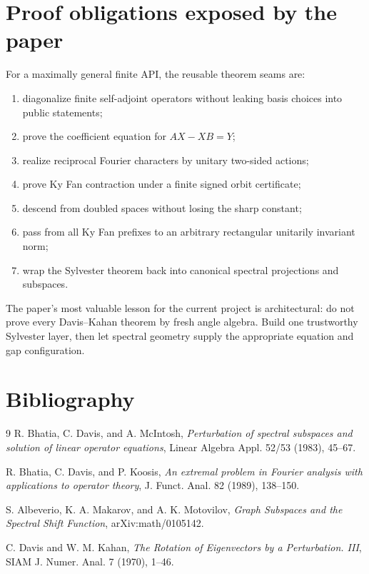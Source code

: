 \section{Proof obligations exposed by the paper}

For a maximally general finite API, the reusable theorem seams are:
\begin{enumerate}[leftmargin=2em]
\item diagonalize finite self-adjoint operators without leaking basis choices into public statements;
\item prove the coefficient equation for $AX-XB=Y$;
\item realize reciprocal Fourier characters by unitary two-sided actions;
\item prove Ky Fan contraction under a finite signed orbit certificate;
\item descend from doubled spaces without losing the sharp constant;
\item pass from all Ky Fan prefixes to an arbitrary rectangular unitarily invariant norm;
\item wrap the Sylvester theorem back into canonical spectral projections and subspaces.
\end{enumerate}

The paper's most valuable lesson for the current project is architectural: do not prove every Davis--Kahan theorem by fresh angle algebra. Build one trustworthy Sylvester layer, then let spectral geometry supply the appropriate equation and gap configuration.

\section*{Bibliography}
\begin{thebibliography}{9}
R. Bhatia, C. Davis, and A. McIntosh,
\emph{Perturbation of spectral subspaces and solution of linear operator equations},
Linear Algebra Appl. 52/53 (1983), 45--67.

R. Bhatia, C. Davis, and P. Koosis,
\emph{An extremal problem in Fourier analysis with applications to operator theory},
J. Funct. Anal. 82 (1989), 138--150.

S. Albeverio, K. A. Makarov, and A. K. Motovilov,
\emph{Graph Subspaces and the Spectral Shift Function},
arXiv:math/0105142.

C. Davis and W. M. Kahan,
\emph{The Rotation of Eigenvectors by a Perturbation. III},
SIAM J. Numer. Anal. 7 (1970), 1--46.
\end{thebibliography}


